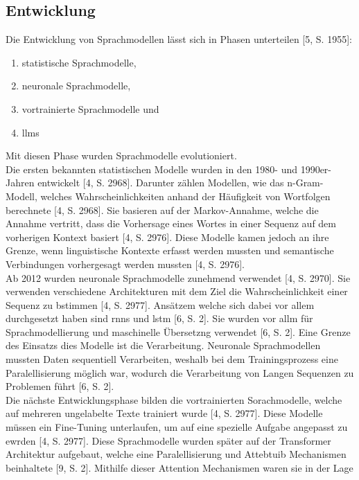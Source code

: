 \subsection{Entwicklung}

Die Entwicklung von Sprachmodellen lässt sich in Phasen unterteilen [5, S. 1955]: 

\begin{enumerate}
  \item statistische Sprachmodelle,
  \item neuronale Sprachmodelle,
  \item vortrainierte Sprachmodelle und
  \item \acp{llm}
\end{enumerate}

Mit diesen Phase wurden Sprachmodelle evolutioniert. \\
Die ersten bekannten statistischen Modelle wurden in den 1980- und 1990er-Jahren entwickelt [4, S. 2968]. Darunter zählen Modellen, wie das n-Gram-Modell, welches 
Wahrscheinlichkeiten anhand der Häufigkeit von Wortfolgen berechnete [4, S. 2968]. Sie basieren auf der Markov-Annahme, welche die Annahme vertritt, dass die 
Vorhersage eines Wortes in einer Sequenz auf dem vorherigen Kontext basiert [4, S. 2976]. Diese Modelle kamen jedoch an ihre Grenze, wenn linguistische 
Kontexte erfasst werden mussten und semantische Verbindungen vorhergesagt werden mussten [4, S. 2976]. \\
Ab 2012 wurden neuronale Sprachmodelle zunehmend verwendet [4, S. 2970]. Sie verwenden verschiedene Architekturen mit dem Ziel die Wahrscheinlichkeit einer 
Sequenz zu bstimmen [4, S. 2977]. Ansätzem welche sich dabei vor allem durchgesetzt haben sind \acp{rnn} und \ac{lstm} [6, S. 2]. Sie wurden vor allm für 
Sprachmodellierung und maschinelle Übersetzng verwendet [6, S. 2]. Eine Grenze des Einsatzs dies Modelle ist die Verarbeitung. Neuronale 
Sprachmodellen mussten Daten sequentiell Verarbeiten, weshalb bei dem Trainingsprozess eine Paralellisierung möglich war, wodurch die Verarbeitung von Langen 
Sequenzen zu Problemen führt [6, S. 2]. \\
Die nächste Entwicklungsphase bilden die vortrainierten Sorachmodelle, welche auf mehreren ungelabelte Texte trainiert wurde [4, S. 2977]. Diese Modelle müssen
ein Fine-Tuning unterlaufen, um auf eine spezielle Aufgabe angepasst zu ewrden  [4, S. 2977]. Diese Sprachmodelle wurden später auf der Transformer Architektur
aufgebaut, welche eine Paralellisierung und Attebtuib Mechanismen beinhaltete [9, S. 2]. Mithilfe dieser Attention Mechanismen waren sie in der Lage 
